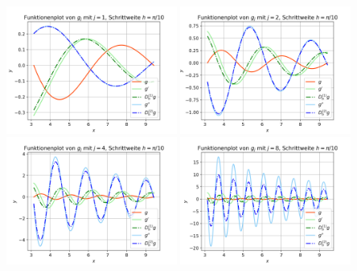 \documentclass{scrartcl}
\begin{document}
\vspace{0.4cm}
{
  \centering
    \includegraphics[width=0.42\textwidth]{Grafiken/Funktionenplot_j1_Pi_Zehntel}
    \includegraphics[width=0.42\textwidth]{Grafiken/Funktionenplot_j2_Pi_Zehntel}\\
    \includegraphics[width=0.42\textwidth]{Grafiken/Funktionenplot_j4_Pi_Zehntel}
    \includegraphics[width=0.42\textwidth]{Grafiken/Funktionenplot_j8_Pi_Zehntel}\\
    \vspace{-0.2cm}

}
\end{document}
